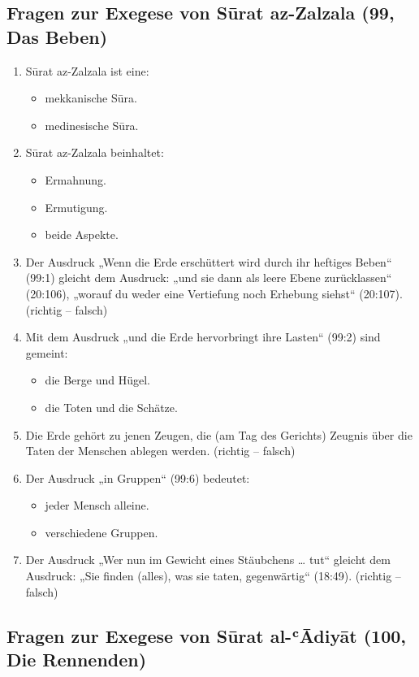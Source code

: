 \subsection*{Fragen zur Exegese von Sūrat az-Zalzala (99, Das Beben)}

\begin{enumerate}[leftmargin=1.6em,resume]
\item Sūrat az-Zalzala ist eine:
  \begin{itemize}
    \item mekkanische Sūra. \item medinesische Sūra.
  \end{itemize}
\item Sūrat az-Zalzala beinhaltet:
  \begin{itemize}
    \item Ermahnung. \item Ermutigung. \item beide Aspekte.
  \end{itemize}
\item Der Ausdruck „Wenn die Erde erschüttert wird durch ihr heftiges Beben“ (99:1) gleicht dem
  Ausdruck: „und sie dann als leere Ebene zurücklassen“ (20:106), „worauf du weder eine
  Vertiefung noch Erhebung siehst“ (20:107). (richtig -- falsch)
\item Mit dem Ausdruck „und die Erde hervorbringt ihre Lasten“ (99:2) sind gemeint:
  \begin{itemize}
    \item die Berge und Hügel. \item die Toten und die Schätze.
  \end{itemize}
\item Die Erde gehört zu jenen Zeugen, die (am Tag des Gerichts) Zeugnis über die Taten der
  Menschen ablegen werden. (richtig -- falsch)
\item Der Ausdruck „in Gruppen“ (99:6) bedeutet:
  \begin{itemize}
    \item jeder Mensch alleine. \item verschiedene Gruppen.
  \end{itemize}
\item Der Ausdruck „Wer nun im Gewicht eines Stäubchens \ldots{} tut“ gleicht dem Ausdruck:
  „Sie finden (alles), was sie taten, gegenwärtig“ (18:49). (richtig -- falsch)
\end{enumerate}

\subsection*{Fragen zur Exegese von Sūrat al-ʿĀdiyāt (100, Die Rennenden)}

